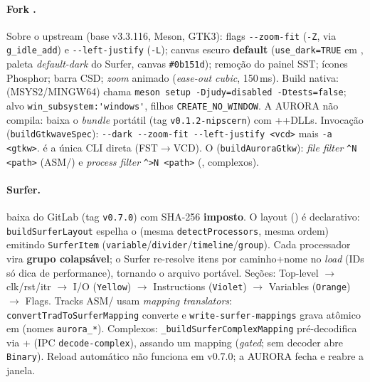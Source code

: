 \paragraph{Fork .} Sobre o upstream (base v3.3.116, Meson, GTK3): flags \lstinline|--zoom-fit| (\lstinline|-Z|, via \lstinline|g_idle_add|) e \lstinline|--left-justify| (\lstinline|-L|); canvas escuro \textbf{default} (\lstinline|use_dark=TRUE| em , paleta \emph{default-dark} do Surfer, canvas \lstinline|#0b151d|); remoção do painel SST; ícones Phosphor; barra CSD; \emph{zoom} animado (\emph{ease-out cubic}, 150\,ms). Build nativa:  (MSYS2/MINGW64) chama \lstinline|meson setup -Djudy=disabled -Dtests=false|; alvo \lstinline|win_subsystem:'windows'|, filhos \lstinline|CREATE_NO_WINDOW|. A AURORA não compila:  baixa o \emph{bundle} portátil (tag \lstinline|v0.1.2-nipscern|) com ++DLLs. Invocação (\lstinline|buildGtkwaveSpec|): \lstinline|--dark --zoom-fit --left-justify <vcd>| mais \lstinline|-a <gtkw>|.  é a única CLI direta (FST$\rightarrow$VCD). O  (\lstinline|buildAuroraGtkw|): \emph{file filter} \lstinline|^N <path>| (ASM/\cmm{}) e \emph{process filter} \lstinline|^>N <path>| (, complexos).

\paragraph{Surfer.}  baixa do GitLab (tag \lstinline|v0.7.0|) com SHA-256 \textbf{imposto}. O layout  () é declarativo: \lstinline|buildSurferLayout| espelha o  (mesma \lstinline|detectProcessors|, mesma ordem) emitindo \lstinline|SurferItem| (\lstinline|variable|/\lstinline|divider|/\lstinline|timeline|/\lstinline|group|). Cada processador vira \textbf{grupo colapsável}; o Surfer re-resolve itens por caminho+nome no \emph{load} (IDs só dica de performance), tornando o arquivo portável. Seções: Top-level $\rightarrow$ clk/rst/itr $\rightarrow$ I/O (\lstinline|Yellow|) $\rightarrow$ Instructions (\lstinline|Violet|) $\rightarrow$ Variables (\lstinline|Orange|) $\rightarrow$ Flags. Tracks ASM/\cmm{} usam \emph{mapping translators}: \lstinline|convertTradToSurferMapping| converte  e \lstinline|write-surfer-mappings| grava atômico em  (nomes \lstinline|aurora_*|). Complexos: \lstinline|_buildSurferComplexMapping| pré-decodifica via + (IPC \lstinline|decode-complex|), assando um mapping (\emph{gated}; sem decoder abre \lstinline|Binary|). Reload automático não funciona em v0.7.0; a AURORA fecha e reabre a janela.

